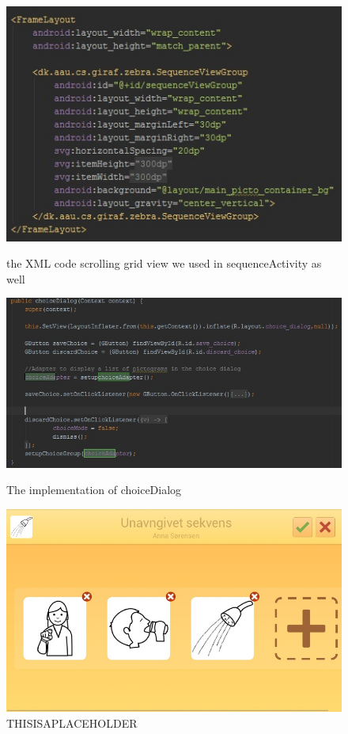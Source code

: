\begin{figure}
\centering
\begin{minipage}{.90\textwidth}
\centering
\includegraphics{Pics/Sprint3/SequenceViewGroup.jpg}
\caption{the XML code scrolling grid view we used in sequenceActivity as well}
\label{fig:SequenceViewGroup}
\end{minipage}\hfill
\begin{minipage}{.90\textwidth}
\centering
\includegraphics{Pics/Sprint3/ChoiceDialog.jpg}
\caption{The implementation of choiceDialog}
\label{fig:choiceDialog}
\end{minipage}\hfill
\begin{minipage}{.90\textwidth}
\centering
\includegraphics[width=14cm]{Pics/Sprint3/EditModeCropped.jpg}
\caption{THISISAPLACEHOLDER}
\label{fig:magicshit}
\end{minipage}
\end{figure}

